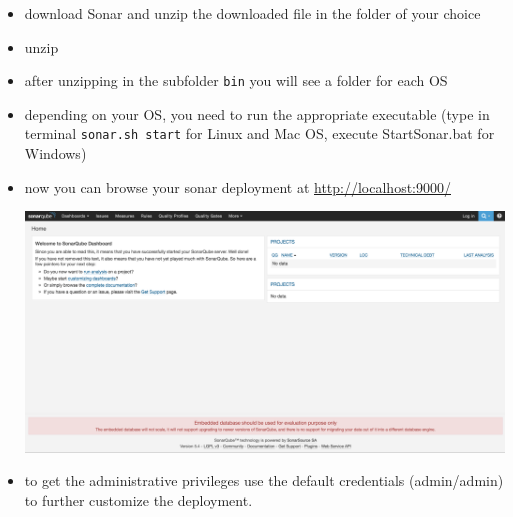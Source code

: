 \documentclass{article}
\begin{document}
\begin{itemize}
\item download Sonar
  \href{https://sonarsource.bintray.com/Distribution/sonarqube/sonarqube-5.4.zip}{}
  and unzip the downloaded file in the folder of your choice
\item unzip
\item after unzipping in the subfolder \texttt{bin} you will see a folder for each OS
\item depending on your OS, you need to run the appropriate executable
  (type in terminal \texttt{sonar.sh start} for Linux and Mac OS,
  execute StartSonar.bat for Windows)
\item now you can browse your sonar deployment at
  \url{http://localhost:9000/}
\begin{center}
\includegraphics[scale=0.3]{figures/ss0.png}
\end{center}
\item to get the administrative privileges use the default credentials
  (admin/admin) to further customize the deployment.


\end{itemize}
\end{document}
